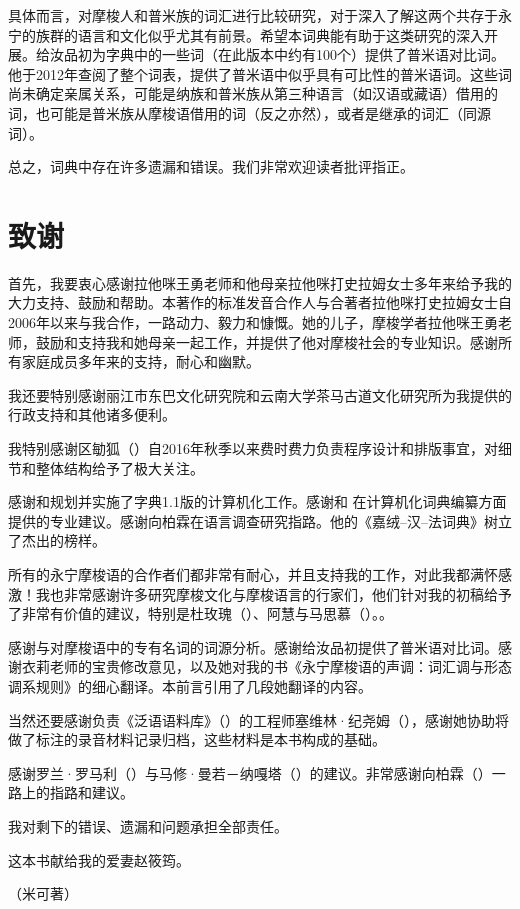 具体而言，对摩梭人和普米族\parencite{daudey2014}的词汇进行比较研究，对于深入了解这两个共存于永宁的族群的语言和文化似乎尤其有前景。希望本词典能有助于这类研究的深入开展。给汝品初为字典中的一些词（在此版本中约有100个）提供了普米语对比词。他于2012年查阅了整个词表，提供了普米语中似乎具有可比性的普米语词。这些词尚未确定亲属关系，可能是纳族和普米族从第三种语言（如汉语或藏语）借用的词，也可能是普米族从摩梭语借用的词（反之亦然），或者是继承的词汇（同源词）。

总之，词典中存在许多遗漏和错误。我们非常欢迎读者批评指正。


\section{致谢}

首先，我要衷心感谢拉他咪王勇老师和他母亲拉他咪打史拉姆女士多年来给予我的大力支持、鼓励和帮助。本著作的标准发音合作人与合著者拉他咪打史拉姆女士自2006年以来与我合作，一路动力、毅力和慷慨。她的儿子，摩梭学者拉他咪王勇老师，鼓励和支持我和她母亲一起工作，并提供了他对摩梭社会的专业知识。感谢所有家庭成员多年来的支持，耐心和幽默。

我还要特别感谢丽江市东巴文化研究院和云南大学茶马古道文化研究所为我提供的行政支持和其他诸多便利。

我特别感谢区勄狐（）自2016年秋季以来费时费力负责程序设计和排版事宜，对细节和整体结构给予了极大关注。

感谢和规划并实施了字典1.1版的计算机化工作。感谢和 在计算机化词典编纂方面提供的专业建议。感谢向柏霖在语言调查研究指路。他的《嘉绒--汉--法词典》树立了杰出的榜样。

所有的永宁摩梭语的合作者们都非常有耐心，并且支持我的工作，对此我都满怀感激！我也非常感谢许多研究摩梭文化与摩梭语言的行家们，他们针对我的初稿给予了非常有价值的建议，特别是杜玫瑰（）、阿慧与马思慕（）。\parencite[vi]{yliniemi_descriptive_2022}。

感谢与对摩梭语中的专有名词的词源分析。感谢给汝品初提供了普米语对比词。感谢衣莉老师的宝贵修改意见，以及她对我的书《永宁摩梭语的声调：词汇调与形态调系规则》的细心翻译。本前言引用了几段她翻译的内容。

当然还要感谢负责《泛语语料库》（）的工程师塞维林·纪尧姆（），感谢她协助将做了标注的录音材料记录归档，这些材料是本书构成的基础。

感谢罗兰·罗马利（）与马修·曼若－纳嘎塔（）的建议。非常感谢向柏霖（）一路上的指路和建议。

我对剩下的错误、遗漏和问题承担全部责任。

这本书献给我的爱妻赵筱筠。

{\raggedleft （米可著）\par}
